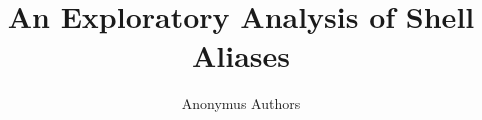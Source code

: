\documentclass[sigconf,review]{acmart}
\begin{document}
\title{An Exploratory Analysis of Shell Aliases}

%

\author{Anonymus Authors}

\begin{abstract}
	
\end{abstract}

\maketitle



















\end{document}
